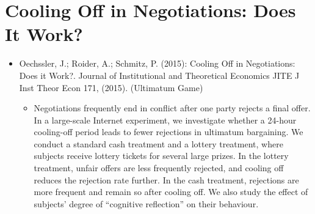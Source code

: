 

\section{Cooling Off in Negotiations: Does It Work?}

\begin{itemize}
	\item Oechssler, J.; Roider, A.; Schmitz, P. (2015): Cooling Off in Negotiations: Does it Work?. Journal of Institutional and Theoretical Economics JITE J Inst Theor Econ 171, (2015). (Ultimatum Game)
		\begin{itemize}
			\item Negotiations frequently end in conflict after one party rejects a final offer. In a large-scale Internet experiment, we investigate whether a 24-hour cooling-off period leads to fewer rejections in ultimatum bargaining. We conduct a standard cash treatment and a lottery treatment, where subjects receive lottery tickets for several large prizes. In the lottery treatment, unfair offers are less frequently rejected, and cooling off reduces the rejection rate further. In the cash treatment, rejections are more frequent and remain so after cooling off. We also study the effect of subjects’ degree of “cognitive reflection” on their behaviour.
		\end{itemize}
\end{itemize}